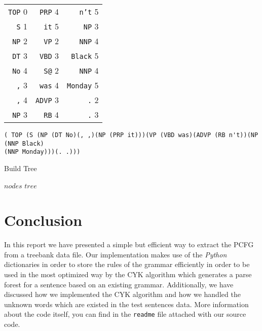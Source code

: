 \documentclass[a4paper,11pt]{article}
\begin{document}
\begin{table}[h!]
\begin{small}
\begin{center}
\begin{tabular}{ r r r }
\texttt{TOP} 0  &  \texttt{PRP} 4    &    \texttt{n't} 5\\  
\texttt{S} 1    &  \texttt{it} 5     &     \texttt{NP} 3\\
\texttt{NP} 2   &  \texttt{VP} 2     &     \texttt{NNP} 4\\       
\texttt{DT} 3   &  \texttt{VBD} 3    &      \texttt{Black} 5\\
\texttt{No} 4   &   \texttt{S@} 2    &     \texttt{NNP} 4\\
\texttt{,} 3    &   \texttt{was} 4  &   \texttt{Monday} 5\\   
\texttt{,} 4    &  \texttt{ADVP} 3 &   \texttt{.} 2\\  
\texttt{NP} 3  &		\texttt{RB} 4& \texttt{.} 3\\
\end{tabular}
\end{center}
\end{small}
\end{table}


\begin{verbatim}
( TOP (S (NP (DT No)(, ,)(NP (PRP it)))(VP (VBD was)(ADVP (RB n't))(NP (NNP Black)
(NNP Monday)))(. .)))
\end{verbatim}


\begin{algorithm}[t!]
\caption{Build Tree}
\label{build}
\begin{scriptsize}
\begin{algorithmic}[1]
 $nodes$
 $tree$
\ELSE
{}
\ENDIF
{}
\ELSE
{}
\ENDIF
\ENDWHILE
{}
\ENDFOR
\end{algorithmic}
\end{scriptsize}
\end{algorithm}



\section{Conclusion}
\label{concl}
In this report we have presented a simple but efficient way to extract the PCFG from a
treebank data file. Our implementation makes use of the \textit{Python} dictionaries in order to store the rules of the grammar efficiently in order to be used in the most optimized way by the CYK algorithm which generates a parse forest for a sentence based on an existing grammar.
 Additionally, we have discussed how we implemented the CYK algorithm and how we handled the unknown words which are existed in the test sentences data. More information about the code itself, you can find in the \texttt{readme} file attached with our source code.
\end{document}
